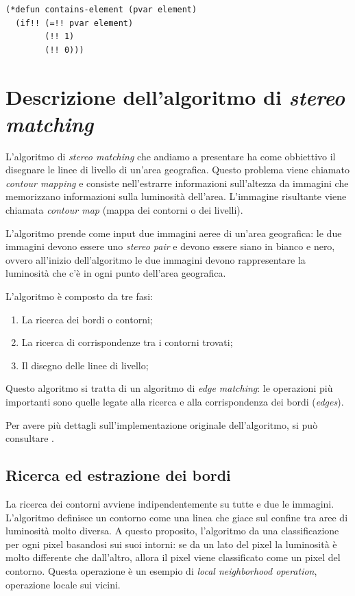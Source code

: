 \documentclass[12pt,a4paper,openright,twoside]{report}
\begin{document}
\begin{lstlisting}[style=mystyle,caption={Esempio di codice *Lisp. Questa versione della funzione implementa la ricerca in parallelo su tutti gli elementi dell'array.}]
(*defun contains-element (pvar element)
  (if!! (=!! pvar element)
        (!! 1)
        (!! 0)))
\end{lstlisting}

\chapter{Descrizione dell'algoritmo di \textit{stereo matching}}

L'algoritmo di \textit{stereo matching} che andiamo a presentare ha come obbiettivo il disegnare le linee di livello di un'area geografica. Questo problema viene chiamato \textit{contour mapping} e consiste nell'estrarre informazioni sull'altezza da immagini che memorizzano informazioni sulla luminosità dell'area. L'immagine risultante viene chiamata \textit{contour map} (mappa dei contorni o dei livelli).

L'algoritmo prende come input due immagini aeree di un'area geografica: le due immagini devono essere uno \textit{stereo pair} e devono essere siano in bianco e nero, ovvero all'inizio dell'algoritmo le due immagini devono rappresentare la luminosità che c'è in ogni punto dell'area geografica.

L'algoritmo è composto da tre fasi:

\begin{enumerate}
    \item La ricerca dei bordi o contorni;
    \item La ricerca di corrispondenze tra i contorni trovati;
    \item Il disegno delle linee di livello;
\end{enumerate}

Questo algoritmo si tratta di un algoritmo di \textit{edge matching}: le operazioni più importanti sono quelle legate alla ricerca e alla corrispondenza dei bordi (\textit{edges}).

Per avere più dettagli sull'implementazione originale dell'algoritmo, si può consultare \cite{originalalgo}.

\section{Ricerca ed estrazione dei bordi}

La ricerca dei contorni avviene indipendentemente su tutte e due le immagini. L'algoritmo definisce un contorno come una linea che giace sul confine tra aree di luminosità molto diversa. A questo proposito, l'algoritmo da una classificazione per ogni pixel basandosi sui suoi intorni: se da un lato del pixel la luminosità è molto differente che dall'altro, allora il pixel viene classificato come un pixel del contorno. Questa operazione è un esempio di \textit{local neighborhood operation}, operazione locale sui vicini.
\end{document}
